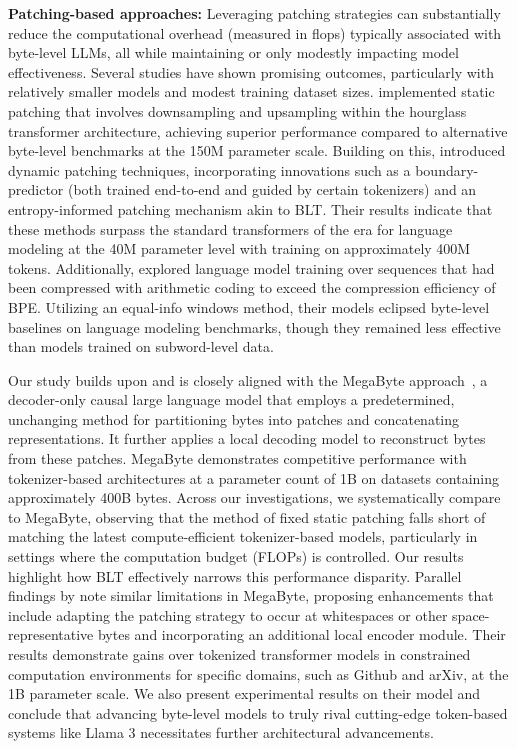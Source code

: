 \textbf{Patching-based approaches:} Leveraging patching strategies can substantially reduce the computational overhead (measured in flops) typically associated with byte-level LLMs, all while maintaining or only modestly impacting model effectiveness. Several studies have shown promising outcomes, particularly with relatively smaller models and modest training dataset sizes. \cite{nawrot-etal-2022-hierarchical} implemented static patching that involves downsampling and upsampling within the hourglass transformer architecture, achieving superior performance compared to alternative byte-level benchmarks at the 150M parameter scale. Building on this, \cite{nawrot-etal-2023-efficient} introduced dynamic patching techniques, incorporating innovations such as a boundary-predictor (both trained end-to-end and guided by certain tokenizers) and an entropy-informed patching mechanism akin to {\textsc BLT}. Their results indicate that these methods surpass the standard transformers of the era for language modeling at the 40M parameter level with training on approximately 400M tokens. Additionally, \cite{lester2024training} explored language model training over sequences that had been compressed with arithmetic coding to exceed the compression efficiency of BPE. Utilizing an equal-info windows method, their models eclipsed byte-level baselines on language modeling benchmarks, though they remained less effective than models trained on subword-level data.

Our study builds upon and is closely aligned with the MegaByte approach~\citep{yu2023megabyte}, a decoder-only causal large language model that employs a predetermined, unchanging method for partitioning bytes into patches and concatenating representations. It further applies a local decoding model to reconstruct bytes from these patches. MegaByte demonstrates competitive performance with tokenizer-based architectures at a parameter count of 1B on datasets containing approximately 400B bytes. Across our investigations, we systematically compare to MegaByte, observing that the method of fixed static patching falls short of matching the latest compute-efficient tokenizer-based models, particularly in settings where the computation budget (FLOPs) is controlled. Our results highlight how {\textsc BLT} effectively narrows this performance disparity. Parallel findings by \cite{slagle2024spacebyte} note similar limitations in MegaByte, proposing enhancements that include adapting the patching strategy to occur at whitespaces or other space-representative bytes and incorporating an additional local encoder module. Their results demonstrate gains over tokenized transformer models in constrained computation environments for specific domains, such as Github and arXiv, at the 1B parameter scale. We also present experimental results on their model and conclude that advancing byte-level models to truly rival cutting-edge token-based systems like Llama 3 necessitates further architectural advancements.


